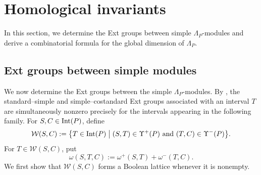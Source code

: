 \section{Homological invariants}
\label{sec:homological-invariants}

In this section, we determine the Ext groups between simple
$\Lambda_P$-modules and derive a combinatorial formula for the global
dimension of $\Lambda_P$.

\subsection{Ext groups between simple modules}
\label{subsec:simple-simple-ext-groups}

We now determine the Ext groups between the simple
$\Lambda_P$-modules.  By
, the standard--simple and
simple--costandard Ext groups associated with an interval $T$ are
simultaneously nonzero precisely for the intervals appearing in the
following family.
  For $S,C\in\operatorname{Int}(P)$, define
\begin{equation}
\label{eq:simple-simple-intermediate-family}
\mathcal W(S,C)
:=
\bigl\{
T\in\operatorname{Int}(P)
\bigm|
(S,T)\in\Upsilon^+(P)
\text{ and }
(T,C)\in\Upsilon^-(P)
\bigr\}.
\end{equation}
For $T\in\mathcal W(S,C)$, put
\begin{equation}
\label{eq:omega}
\omega(S,T,C)
:=
\omega^+(S,T)+\omega^-(T,C).
\end{equation}
We first show that $\mathcal W(S,C)$ forms a Boolean lattice whenever it is nonempty.

